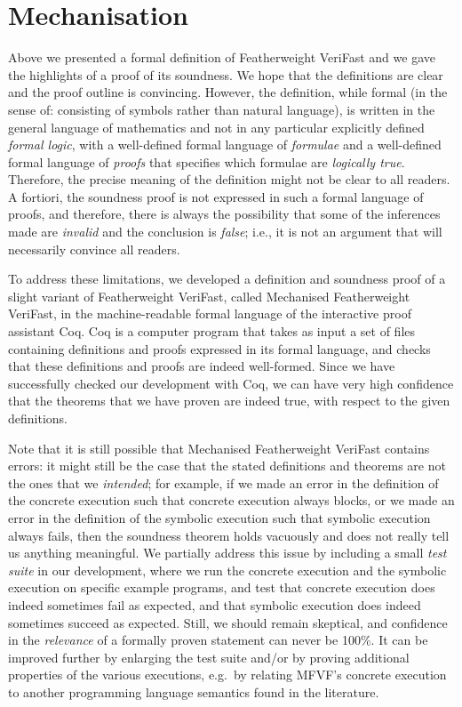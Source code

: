 \documentclass{CSML}
\theoremstyle{definition}\newtheorem{notation}[thm]{Notation}
\theoremstyle{plain}\newtheorem{satz}[thm]{Satz}
\begin{document}
\section{Mechanisation}\label{sec:mech}

Above we presented a formal definition of Featherweight VeriFast and we 
gave the highlights of a proof of its soundness. We hope that the 
definitions are clear and the proof outline is convincing. However, the 
definition, while formal (in the sense of: consisting of symbols rather 
than natural language), is written in the general language of mathematics 
and not in any particular explicitly defined \emph{formal logic}, with a 
well-defined formal language of \emph{formulae} and a well-defined formal 
language of \emph{proofs} that specifies which formulae are 
\emph{logically true}. Therefore, the precise meaning of the definition 
might not be clear to all readers. A fortiori, the soundness proof is not 
expressed in such a formal language of proofs, and therefore, there is 
always the possibility that some of the inferences made are \emph{invalid} 
and the conclusion is \emph{false}; i.e., it is not an argument that will 
necessarily convince all readers.

To address these limitations, we developed a definition and soundness 
proof of a slight variant of Featherweight VeriFast, called Mechanised 
Featherweight VeriFast, in the machine-readable formal language of the 
interactive proof assistant Coq. Coq is a computer program that takes 
as input a set of files containing definitions and proofs expressed in its 
formal language, and checks that these definitions and proofs are indeed 
well-formed. Since we have successfully checked our development with Coq, 
we can have very high confidence that the theorems that we have proven are 
indeed true, with respect to the given definitions.

Note that it is still possible that Mechanised Featherweight VeriFast 
contains errors: it might still be the case that the stated definitions 
and theorems are not the ones that we \emph{intended}; for example, if we 
made an error in the definition of the concrete execution such that 
concrete execution always blocks, or we made an error in the definition of 
the symbolic execution such that symbolic execution always fails, then the 
soundness theorem holds vacuously and does not really tell us anything 
meaningful. We partially address this issue by including a small 
\emph{test suite} in our development, where we run the concrete execution 
and the symbolic execution on specific example programs, and test that 
concrete execution does indeed sometimes fail as expected, and that 
symbolic execution does indeed sometimes succeed as expected. Still, we 
should remain skeptical, and confidence in the \emph{relevance} of a 
formally proven statement can never be 100\%. It can be improved further 
by enlarging the test suite and/or by proving additional properties of the 
various executions, e.g.~by relating MFVF's concrete execution to another 
programming language semantics found in the literature.
\end{document}
